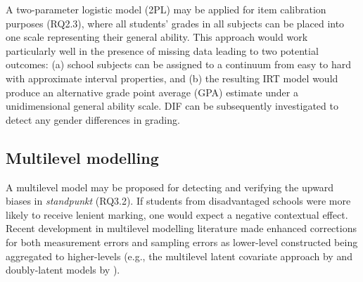\documentclass[
    a4paper,            %
    12pt,               %
    stu,                %
    donotrepeattitle,   %
    noextraspace,       %
    floatsintext,       %
    biblatex,           %
    colorlinks=true,        %
    linkcolor=red,          %
    anchorcolor=black,      %
    citecolor=blue,         %
    urlcolor=blue,          %
    bookmarks=true,         %
    bookmarksopen=false,    %
    bookmarksnumbered=true  %
]{apa7}
\begin{document}
A two-parameter logistic model (2PL) may be applied for item calibration purposes (RQ2.3), where all students' grades in all subjects can be placed into one scale representing their general ability. This approach would work particularly well in the presence of missing data \parencite{olson:2021} leading to two potential outcomes: (a) school subjects can be assigned to a continuum from easy to hard with approximate interval properties, and (b) the resulting IRT model would produce an alternative grade point average (GPA) estimate under a unidimensional general ability scale. DIF can be subsequently investigated to detect any gender differences in grading.

\subsection{Multilevel modelling}

A multilevel model may be proposed for detecting and verifying the upward biases in \textit{standpunkt} (RQ3.2). If students from disadvantaged schools were more likely to receive lenient marking, one would expect a negative contextual effect. Recent development in multilevel modelling literature made enhanced corrections for both measurement errors and sampling errors as lower-level constructed being aggregated to higher-levels (e.g., the multilevel latent covariate approach by \textcite{ludtke:2008} and doubly-latent models by \textcite{marsh:2009}).

\printbibliography
\end{document}
